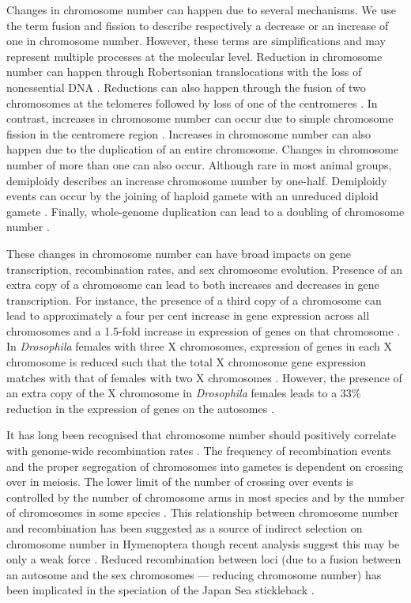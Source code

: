 \documentclass[]{rsos}%
\begin{document}
Changes in chromosome number can happen due to several mechanisms.
We use the term fusion and fission to describe respectively a decrease or an increase of one in chromosome number.
However, these terms are simplifications and may represent multiple processes at the molecular level.
Reduction in chromosome number can happen through Robertsonian translocations with the loss of nonessential DNA \cite{garagna1995}.
Reductions can also happen through the fusion of two chromosomes at the telomeres followed by loss of one of the centromeres \cite{gordon2011mechanisms, miga2016}.
In contrast, increases in chromosome number can occur due to simple chromosome fission in the centromere region \cite{moretti1984}.
Increases in chromosome number can also happen due to the duplication of an entire chromosome.
Changes in chromosome number of more than one can also occur.
Although rare in most animal groups, demiploidy describes an increase chromosome number by one-half. 
Demiploidy events can occur by the joining of haploid gamete with an unreduced diploid gamete \cite{hornsey1973}.
Finally, whole-genome duplication can lead to a doubling of chromosome number \cite{beccak1970}.

These changes in chromosome number can have broad impacts on gene transcription, recombination rates, and sex chromosome evolution.
Presence of an extra copy of a chromosome can lead to both increases and decreases in gene transcription.  
For instance, the presence of a third copy of a chromosome can lead to approximately a four per cent increase in gene expression across all chromosomes and a 1.5-fold increase in expression of genes on that chromosome \cite{lockstone2007, williams2008aneuploidy}.
In \textit{Drosophila} females with three X chromosomes, expression of genes in each X chromosome is reduced such that the total X chromosome gene expression matches with that of females with two X chromosomes \cite{sun2013dosage}.
However, the presence of an extra copy of the X chromosome in \textit{Drosophila} females leads to a 33\% reduction in the expression of genes on the autosomes \cite{sun2013dosage}. 

It has long been recognised that chromosome number should positively correlate with genome-wide recombination rates \cite{stebbins1958}.
The frequency of recombination events and the proper segregation of chromosomes into gametes is dependent on crossing over in meiosis.
The lower limit of the number of crossing over events is controlled by the number of chromosome arms in most species and by the number of chromosomes in some species \cite{dumont2017req}.
This relationship between chromosome number and recombination has been suggested as a source of indirect selection on chromosome number in Hymenoptera though recent analysis suggest this may be only a weak force \cite{ross2015, sherman1979}.
Reduced recombination between loci (due to a fusion between an autosome and the sex chromosomes --- reducing chromosome number) has been implicated in the speciation of the Japan Sea stickleback \cite{kitano2012}. 
\end{document}
